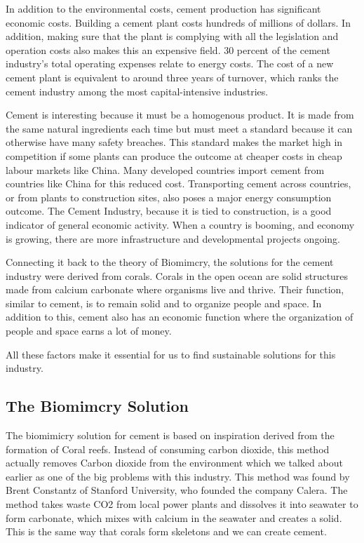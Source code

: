 In addition to the environmental costs, cement production has significant economic costs.  Building a cement plant costs hundreds of millions of dollars. In addition, making sure that the plant is complying with all the legislation and operation costs also makes this an expensive field. 30 percent of the cement industry's total operating expenses relate to energy costs. The cost of a new cement plant is equivalent to around three years of turnover, which ranks the cement industry among the most capital-intensive industries. 

Cement is interesting because it must be a homogenous product. It is made from the same natural ingredients each time but must meet a standard because it can otherwise have many safety breaches. This standard makes the market high in competition if some plants can produce the outcome at cheaper costs in cheap labour markets like China. Many developed countries import cement from countries like China for this reduced cost. Transporting cement across countries, or from plants to construction sites, also poses a major energy consumption outcome.
The Cement Industry, because it is tied to construction, is a good indicator of general economic activity. When a country is booming, and economy is growing, there are more infrastructure and developmental projects ongoing. 

Connecting it back to the theory of Biomimcry, the solutions for the cement industry were derived from corals. Corals in the open ocean are solid structures made from calcium carbonate where organisms live and thrive. Their function, similar to cement, is to remain solid and to organize people and space. In addition to this, cement also has an economic function where the organization of people and space earns a lot of money.

All these factors make it essential for us to find sustainable solutions for this industry.

\subsection{The Biomimcry Solution}

The biomimicry solution for cement is based on inspiration derived from the formation of Coral reefs. Instead of consuming carbon dioxide, this method actually removes Carbon dioxide from the environment which we talked about earlier as one of the big problems with this industry. This method was found by Brent Constantz of Stanford University, who founded the company Calera. The method takes waste CO2 from local power plants and dissolves it into seawater to form carbonate, which mixes with calcium in the seawater and creates a solid.  This is the same way that corals form skeletons and we can create cement.

